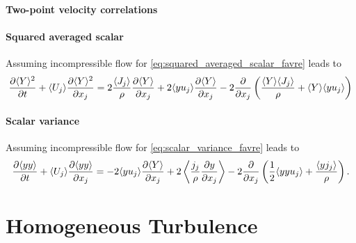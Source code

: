 \documentclass[oneside,a4paper,11pt]{report}
\begin{document}
\subsection{Two-point velocity correlations}

\subsection{Squared averaged scalar}
Assuming incompressible flow for \cref{eq:squared_averaged_scalar_favre} leads to
\begin{equation}
    \frac{\partial \langle Y \rangle ^2}{\partial t} + \langle U_j \rangle \frac{\partial \langle Y \rangle^2}{\partial x_j} = 2\frac{\langle J_j \rangle}{\rho} \frac{\partial \langle Y \rangle}{\partial x_j} + 2\langle y u_j \rangle \frac{\partial \langle Y \rangle}{\partial x_j} - 2\frac{\partial}{\partial x_j} \left ( \frac{\langle Y \rangle \langle J_j \rangle}{\rho} + \langle Y \rangle \langle y u_j \rangle \right )
\end{equation}

\subsection{Scalar variance}
Assuming incompressible flow for \cref{eq:scalar_variance_favre} leads to
\begin{equation}
    \label{eq:scalar_variance_rans}
    \frac{\partial \langle y y \rangle}{\partial t} + \langle U_j \rangle \frac{\partial  \langle y y \rangle }{\partial x_j} = -2 \langle y u_j \rangle \frac{\partial \langle Y \rangle}{\partial x_j} + 2 \left < \frac{j_j}{\rho} \frac{\partial y}{\partial x_j} \right > - 2 \frac{\partial}{\partial x_j} \left ( \frac{1}{2} \langle y y u_j \rangle +  \frac{ \langle y j_j \rangle}{\rho} \right).
\end{equation}

\part{Homogeneous Turbulence}
%
\end{document}
